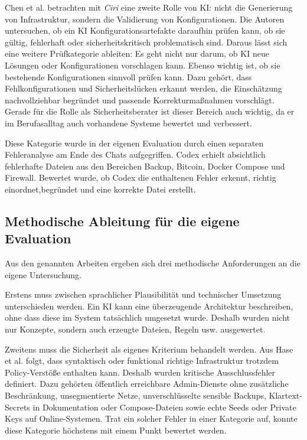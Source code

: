 Chen et al. betrachten mit \emph{Ciri} eine zweite Rolle von \acs{KI}: nicht die Generierung von Infrastruktur, sondern die Validierung von Konfigurationen. Die Autoren untersuchen, ob ein \acs{KI} Konfigurationsartefakte daraufhin prüfen kann, ob sie gültig, fehlerhaft oder sicherheitskritisch problematisch sind. \cite{chen2023ciri} Daraus lässt sich eine weitere Prüfkategorie ableiten: Es geht nicht nur darum, ob \acs{KI} neue Lösungen oder Konfigurationen vorschlagen kann. Ebenso wichtig ist, ob sie bestehende Konfigurationen sinnvoll prüfen kann. Dazu gehört, dass Fehlkonfigurationen und Sicherheitslücken erkannt werden, die Einschätzung nachvollziehbar begründet und passende Korrekturmaßnahmen vorschlägt. Gerade für die Rolle als Sicherheitsberater ist dieser Bereich auch wichtig, da er im Berufasalltag auch vorhandene Systeme bewertet und verbessert.

Diese Kategorie wurde in der eigenen Evaluation durch einen separaten Fehleranalyse am Ende des Chats aufgegriffen. Codex erhielt absichtlich fehlerhafte Dateien aus den Bereichen Backup, Bitcoin, Docker Compose und Firewall. Bewertet wurde, ob Codex die enthaltenen Fehler erkennt, richtig einordnet,begründet und eine korrekte Datei erstellt. 


\subsection{Methodische Ableitung für die eigene Evaluation}

Aus den genannten Arbeiten ergeben sich drei methodische Anforderungen an die eigene Untersuchung.

Erstens muss zwischen sprachlicher Plausibilität und technischer Umsetzung unterschieden werden. Ein \acs{KI} kann eine überzeugende Architektur beschreiben, ohne dass diese im System tatsächlich umgesetzt wurde. Deshalb wurden nicht nur Konzepte, sondern auch erzeugte Dateien, Regeln usw. ausgewertet.

Zweitens muss die Sicherheit als eigenes Kriterium behandelt werden. Aus Hase et al. folgt, dass syntaktisch oder funktional richtige Infrastruktur trotzdem Policy-Verstöße enthalten kann.\cite{hase2026securitypolicyiac} Deshalb wurden kritische Ausschlussfehler definiert. Dazu gehörten öffentlich erreichbare Admin-Dienste ohne zusätzliche Beschränkung, unsegmentierte Netze, unverschlüsselte sensible Backups, Klartext-Secrets in Dokumentation oder Compose-Dateien sowie echte Seeds oder Private Keys auf Online-Systemen. Trat ein solcher Fehler in einer Kategorie auf, konnte diese Kategorie höchstens mit einem Punkt bewertet werden.

